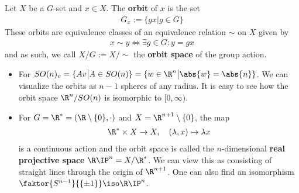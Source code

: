 \begin{dfn}[]
Let $X$ be a $G$-set and $x \in X$. The \textbf{orbit} of $x$ is the set
\begin{align*}
  G_x := \{gx \big\vert g \in G\}
\end{align*}
These orbits are equivalence classes of an equivalence relation $\sim$ on $X$ given by
\begin{align*}
  x \sim y \iff \exists g \in G: y = gx
\end{align*}
and as such, we call $X/G := X/\sim$ the \textbf{orbit space} of the group action.
\end{dfn}

\begin{ex}[]
  \phantom{a}
\begin{itemize}
  \item For $SO(n)_v = \{Av \big\vert A \in SO(n)\} = \{w \in \R^{n} \big\vert \abs{w} = \abs{n}\}$.
    We can visualize the orbits as $n-1$ spheres of any radius. 
    It is easy to see how the orbit space $\R^{n}/SO(n)$ is isomorphic to $[0,\infty)$.
  \item For $G = \R^{\ast} = (\R \setminus \{0\}, \cdot)$ and $X = \R^{n+1} \setminus \{0\}$, the map
    \begin{align*}
      \R^{\ast} \times X \to X, \quad (\lambda,x) \mapsto  \lambda x
    \end{align*}
    is a continuous action and the orbit space is called the $n$-dimensional \textbf{real projective space} $\R\IP^{n} = X/\R^{\ast}$.
    We can view this as consisting of straight lines through the origin of $\R^{n+1}$.
    One can also find an isomorphism $\faktor{S^{n-1}}{\{\pm 1\}} \iso \R\IP^{n}$.
\end{itemize}
\end{ex}



